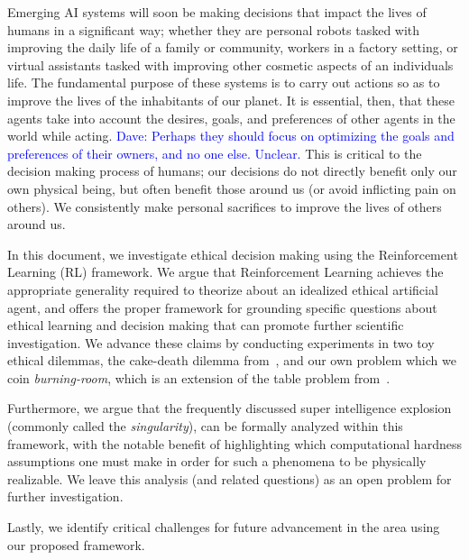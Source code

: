 \documentclass[11pt]{article}
\newcommand\davenote[1]{\textcolor{blue}{Dave: #1}}
\begin{document}
Emerging AI systems will soon be making decisions that impact the lives of humans in a significant way; whether they are personal robots tasked with improving the daily life of a family or community,  workers in a factory setting, or virtual assistants tasked with improving other cosmetic aspects of an individuals life. The fundamental purpose of these systems is to carry out actions so as to improve the lives of the inhabitants of our planet. It is essential, then, that these agents take into account the desires, goals, and preferences of other agents in the world while acting. \davenote{Perhaps they should focus on optimizing the goals and preferences of their owners, and no one else. Unclear.} This is critical to the decision making process of humans; our decisions do not directly benefit only our own physical being, but often benefit those around us (or avoid inflicting pain on others). We consistently make personal sacrifices to improve the lives of others around us.

In this document, we investigate ethical decision making using the Reinforcement Learning (RL) framework. We argue that Reinforcement Learning achieves the appropriate generality required to theorize about an idealized ethical artificial agent, and offers the proper framework for grounding specific questions about ethical learning and decision making that can promote further scientific investigation. We advance these claims by conducting experiments in two toy ethical dilemmas, the cake-death dilemma from~\cite{AAAIW1510183}, and our own problem which we coin {\it burning-room}, which is an extension of the table problem from~\cite{briggs2015sorry}.

Furthermore, we argue that the frequently discussed super intelligence explosion (commonly called the {\it singularity}), can be formally analyzed within this framework, with the notable benefit of highlighting which computational hardness assumptions one must make in order for such a phenomena to be physically realizable. We leave this analysis (and related questions) as an open problem for further investigation.

Lastly, we identify critical challenges for future advancement in the area using our proposed framework.

\end{document}
